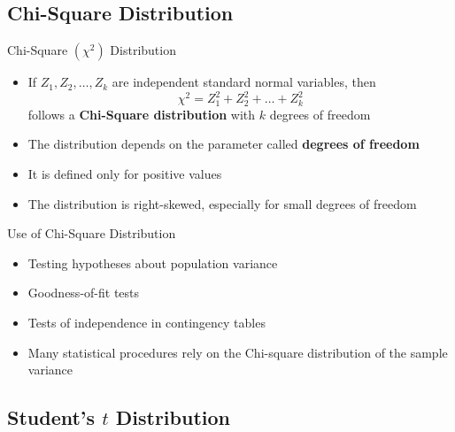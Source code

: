 \documentclass[12pt, aspectratio=169]{beamer}
\begin{document}
    \subsection{Chi-Square Distribution}

    \begin{frame}{Chi-Square \((\chi^2)\) Distribution}
        \begin{itemize}
            \item If \(Z_1, Z_2, \dots, Z_k\) are independent standard normal variables, then
            \[
                \chi^2 = Z_1^2 + Z_2^2 + \dots + Z_k^2
            \]
            follows a \textbf{Chi-Square distribution} with \(k\) degrees of freedom
            \item The distribution depends on the parameter called \textbf{degrees of freedom}
            \item It is defined only for positive values
            \item The distribution is right-skewed, especially for small degrees of freedom
        \end{itemize}
    \end{frame}


    \begin{frame}{Use of Chi-Square Distribution}
        \begin{itemize}
            \item Testing hypotheses about population variance
            \item Goodness-of-fit tests
            \item Tests of independence in contingency tables
            \item Many statistical procedures rely on the Chi-square distribution of the sample variance
        \end{itemize}
    \end{frame}


    \subsection{Student's \(t\) Distribution}
\end{document}
